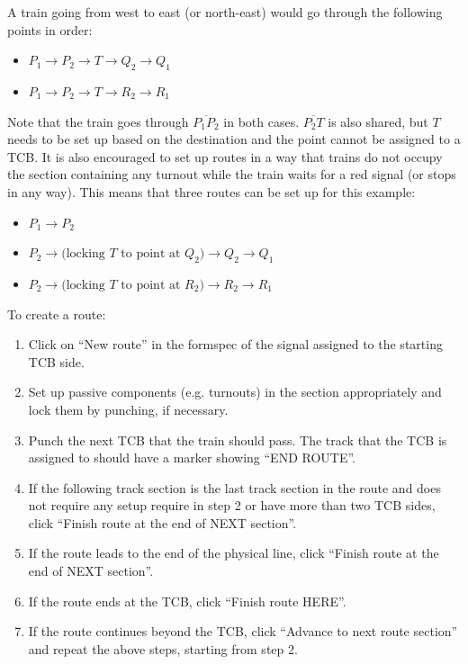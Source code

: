 \documentclass[notitlepage]{article}
\begin{document}
A train going from west to east (or north-east) would go through the following points in order:
\begin{itemize}
\item $P_{1} \to P_{2} \to T \to Q_{2} \to Q_{1}$
\item $P_{1} \to P_{2} \to T \to R_{2} \to R_{1}$
\end{itemize}

Note that the train goes through $\overline{P_{1}P_{2}}$ in both cases. $\overline{P_{2}T}$ is also shared, but $T$ needs to be set up based on the destination and the point cannot be assigned to a TCB. It is also encouraged to set up routes in a way that trains do not occupy the section containing any turnout while the train waits for a red signal (or stops in any way). This means that three routes can be set up for this example:
\begin{itemize}
\item $P_{1} \to P_{2}$
\item \(P_{2} \to \text{(locking $T$ to point at $Q_{2}$)} \to Q_{2} \to Q_{1}\)
\item \(P_{2} \to \text{(locking $T$ to point at $R_{2}$)} \to R_{2} \to R_{1}\)
\end{itemize}

To create a route:
\begin{enumerate}
\item Click on ``New route'' in the formspec of the signal assigned to the starting TCB side.
\item Set up passive components (e.g. turnouts) in the section appropriately and lock them by punching, if necessary.
\item Punch the next TCB that the train should pass. The track that the TCB is assigned to should have a marker showing ``END ROUTE''.
\item If the following track section is the last track section in the route and does not require any setup require in step 2 or have more than two TCB sides, click ``Finish route at the end of NEXT section''.
\item If the route leads to the end of the physical line, click ``Finish route at the end of NEXT section''.
\item If the route ends at the TCB, click ``Finish route HERE''.
\item If the route continues beyond the TCB, click ``Advance to next route section'' and repeat the above steps, starting from step 2.
\end{enumerate}
\end{document}
